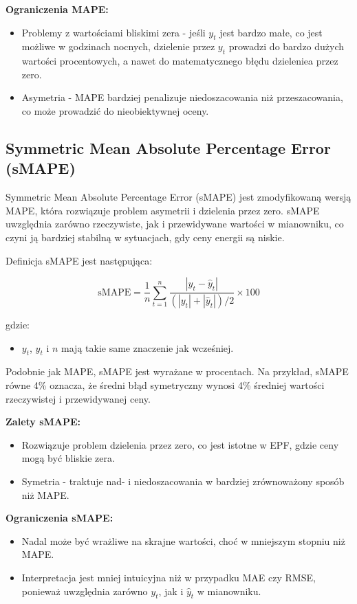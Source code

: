 \textbf{Ograniczenia MAPE:}
\begin{itemize}
    \item Problemy z wartościami bliskimi zera - jeśli \( y_t \) jest bardzo małe, co jest możliwe w godzinach nocnych, dzielenie przez \( y_t \) prowadzi do bardzo dużych wartości procentowych, a nawet do matematycznego błędu dzieleniea przez zero.
    \item Asymetria - MAPE bardziej penalizuje niedoszacowania niż przeszacowania, co może prowadzić do nieobiektywnej oceny.
\end{itemize}

\subsection{Symmetric Mean Absolute Percentage Error (sMAPE)}
\label{subsec:smape}

Symmetric Mean Absolute Percentage Error (sMAPE) jest zmodyfikowaną wersją MAPE, która rozwiązuje problem asymetrii i dzielenia przez zero. sMAPE uwzględnia zarówno rzeczywiste, jak i przewidywane wartości w mianowniku, co czyni ją bardziej stabilną w sytuacjach, gdy ceny energii są niskie.

Definicja sMAPE jest następująca:

\[
\text{sMAPE} = \frac{1}{n} \sum_{t=1}^{n} \frac{\left| y_t - \hat{y}_t \right|}{\left( \left| y_t \right| + \left| \hat{y}_t \right| \right) / 2} \times 100
\]

gdzie:
\begin{itemize}
    \item \( y_t \), \( \hat{y}_t \) i \( n \) mają takie same znaczenie jak wcześniej.
\end{itemize}

Podobnie jak MAPE, sMAPE jest wyrażane w procentach. Na przykład, sMAPE równe 4\% oznacza, że średni błąd symetryczny wynosi 4\% średniej wartości rzeczywistej i przewidywanej ceny.

\textbf{Zalety sMAPE:}
\begin{itemize}
    \item Rozwiązuje problem dzielenia przez zero, co jest istotne w EPF, gdzie ceny mogą być bliskie zera.
    \item Symetria - traktuje nad- i niedoszacowania w bardziej zrównoważony sposób niż MAPE.
\end{itemize}

\textbf{Ograniczenia sMAPE:}
\begin{itemize}
    \item Nadal może być wrażliwe na skrajne wartości, choć w mniejszym stopniu niż MAPE.
    \item Interpretacja jest mniej intuicyjna niż w przypadku MAE czy RMSE, ponieważ uwzględnia zarówno \( y_t \), jak i \( \hat{y}_t \) w mianowniku.
\end{itemize}

